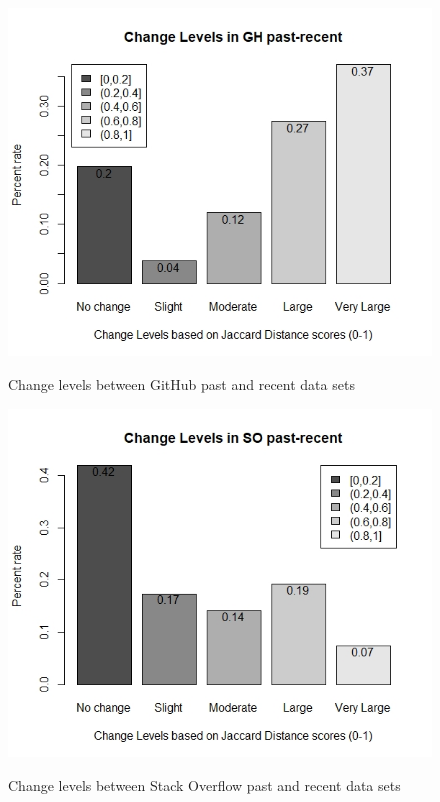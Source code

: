         
        \begin{figure}
          \centering
          \includegraphics[width=\textwidth]{figures/change_level_GH_past-recent.jpeg}\\
          \caption{Change levels between GitHub past and recent data sets}
          \label{fig:change_GH_past_recent}
        \end{figure}
        
        \begin{figure}
          \centering
          \includegraphics[width=\textwidth]{figures/change_levels_SO_past-recent.jpeg}\\
          \caption{Change levels between Stack Overflow past and recent data sets}
          \label{fig:change_SO_past_recent}
        \end{figure}
        
